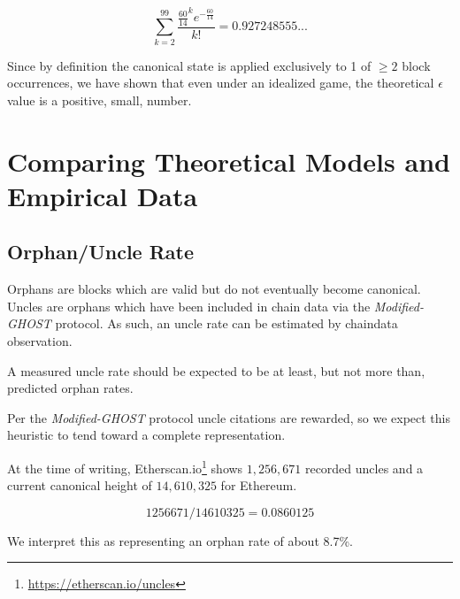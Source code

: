 \documentclass[11pt]{article}
\theoremstyle{plain}
\newcommand{\mghost}{\textit{Modified-GHOST }}
\begin{document}
{%
\begin{equation}
    \sum_{k=2}^{99}\frac{\frac{60}{14}^{k}e^{-\frac{60}{14}}}{k!} = 0.927248555...
\end{equation}


Since by definition the canonical state is applied exclusively to 1 of
$\geq 2$ block occurrences, we have shown that even under an idealized game,
the theoretical $\epsilon$ value is a positive, small, number.
} %


\section{\normalsize{Comparing Theoretical Models and Empirical Data}}

\subsection{\normalsize{Orphan/Uncle Rate}}

Orphans are blocks which are valid but do not eventually become canonical.
Uncles are orphans which have been included in chain data via the \mghost protocol.
As such, an uncle rate can be estimated by chaindata observation.

A measured uncle rate should be expected to be at least, but not more than, predicted orphan rates.

Per the \mghost protocol uncle citations are rewarded, so we expect this heuristic
to tend toward a complete representation.

At the time of writing, Etherscan.io\footnote{\url{https://etherscan.io/uncles}}
shows $1,256,671$ recorded uncles and a current canonical height of $14,610,325$ for Ethereum.

\begin{equation}
    1256671 / 14610325 =  0.0860125
\end{equation}

We interpret this as representing an orphan rate of about 8.7\%.
\end{document}

